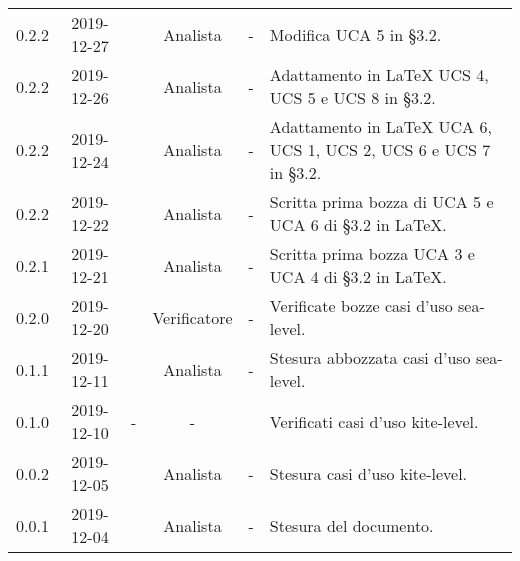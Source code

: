 {\begin{longtable}{ c c  C{2.3cm} c C{3cm} C{3.2cm}}
0.2.2 & 2019-12-27 & \PF{} & Analista & - & Modifica UCA 5 in §3.2. \\

0.2.2 & 2019-12-26 & \CE{} & Analista & - & Adattamento in \LaTeX{} UCS 4, UCS 5 e UCS 8 in §3.2. \\

0.2.2 & 2019-12-24 & \DF{} & Analista & - & Adattamento in \LaTeX{} UCA 6, UCS 1, UCS 2, UCS 6 e UCS 7 in §3.2. \\

0.2.2 & 2019-12-22 & \PF{} & Analista & - & Scritta prima bozza di UCA 5 e UCA 6 di §3.2 in \LaTeX. \\

0.2.1 & 2019-12-21 & \PF{} & Analista & - & Scritta prima bozza UCA 3 e UCA 4 di §3.2 in \LaTeX. \\

0.2.0 & 2019-12-20 & \SE{} & Verificatore & - & Verificate bozze casi d'uso sea-level. \\

0.1.1 & 2019-12-11 & \DF{} & Analista & - & Stesura abbozzata casi d'uso sea-level. \\

0.1.0 & 2019-12-10 & - & - & \BR{} & Verificati casi d'uso kite-level. \\

0.0.2 & 2019-12-05 & \CE{} & Analista & - & Stesura casi d'uso kite-level. \\

0.0.1 & 2019-12-04 & \CE{} & Analista & - & Stesura del documento. \\		
		
\end{longtable}
}